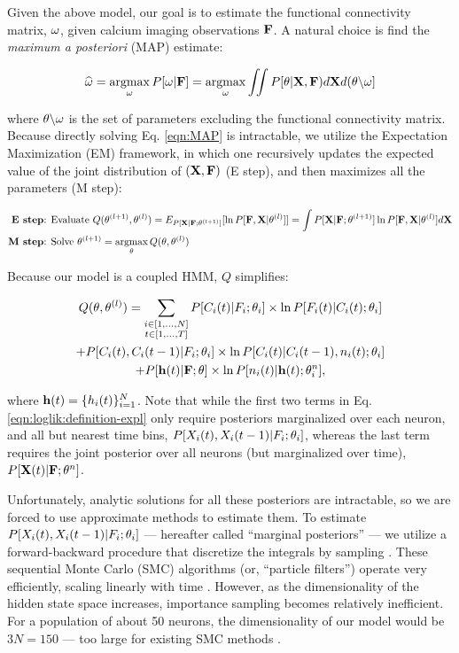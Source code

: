 Given the above model, our goal is to estimate the functional connectivity matrix, $\mathbf{\omega}$, given calcium imaging observations ${\bf F}$. A natural choice is find the \emph{maximum a posteriori} (MAP) estimate:

\begin{equation}\label{eqn:MAP}
\widehat{\mathbf{\omega}}=\operatorname*{argmax}_{\mathbf{\omega}} P[\mathbf{\omega}| {\bf F}] = \operatorname*{argmax}_{\mathbf{\omega}} \iint P[\mathbf{\theta}| {\bf X}, {\bf F}) d{\bf X} d(\mathbf{\theta} \backslash \mathbf{\omega}]
\end{equation}

\noindent where $\mathbf{\theta} \backslash \mathbf{\omega}$ is the set of parameters excluding the functional connectivity matrix.  Because directly solving Eq. \eqref{eqn:MAP} is intractable, we utilize the Expectation Maximization (EM) framework, in which one recursively updates the expected value of the joint distribution of $({\bf X}, {\bf F})$ (E step), and then maximizes all the parameters (M step):

\begin{align*}
\textbf{E step} &\text{: Evaluate } Q(\mathbf{\theta}^{(l+1)},\mathbf{\theta}^{(l)}) = E_{P[{\bf X} | {\bf F}; \mathbf{\theta}^{(l+1)}]}[ \ln P[{\bf F}, {\bf X} | \mathbf{\theta}^{(l)}]] = \int P[{\bf X} | {\bf F}; \mathbf{\theta}^{(l+1)}] \ln P[{\bf F}, {\bf X} | \mathbf{\theta}^{(l)}] d {\bf X}  \\
\textbf{M step} &\text{: Solve } \mathbf{\theta}^{(l+1)} = \operatorname*{argmax}_{\mathbf{\theta}} Q(\mathbf{\theta},\mathbf{\theta}^{(l)})  
\end{align*}

Because our model is a coupled HMM, $Q$ simplifies:

\begin{multline}\label{eqn:loglik:definition-expl}
Q(\mathbf{\theta},\mathbf{\theta}^{(l)}) = 
\sum_{\substack{i \in [1,\ldots,N] \\ t \in [1,\ldots, T]}} 
P[C_i(t) | F_i; \mathbf{\theta}_i] \times \ln P[F_i(t)|C_i(t); \mathbf{\theta}_i] 
\\ + P[C_i(t), C_i(t-1) | F_i; \mathbf{\theta}_i] \times \ln P[C_i(t)|C_i(t-1), n_i(t); \mathbf{\theta}_i] 
\\ + P[\mathbf{h}(t) | {\bf F}; \mathbf{\theta}] \times \ln P[n_i(t)| \mathbf{h}(t); \mathbf{\theta}^n_i],
\end{multline}

\noindent where $\mathbf{h}(t)=\{h_i(t)\}_{i=1}^N$.  Note that while the first two terms in Eq. \eqref{eqn:loglik:definition-expl} only require posteriors marginalized over each neuron, and all but nearest time bins, $P[X_i(t), X_i(t-1) | F_i; \mathbf{\theta}_i]$, whereas the last term requires the joint posterior over all neurons (but marginalized over time), $P[{\bf X}(t) | {\bf F}; \mathbf{\theta}^n]$.  

Unfortunately, analytic solutions for all these posteriors are intractable, so we are forced to use approximate methods to estimate them.  To estimate $P[X_i(t), X_i(t-1) | F_i; \mathbf{\theta}_i]$ --- hereafter called ``marginal posteriors'' ---  we utilize a forward-backward procedure that discretize the integrals by sampling \cite{DFG01, MINKAPHD, Fearnhead2003, koyama08, Andrieu2007, NBR03}.  These sequential Monte Carlo (SMC) algorithms (or, ``particle filters'') operate very efficiently, scaling linearly with time \cite{RAB89}. However, as the dimensionality of the hidden state space increases, importance sampling becomes relatively inefficient.  For a population of about 50 neurons, the dimensionality of our model would be $3N=150$ --- too large for existing SMC methods \cite{??}.  

